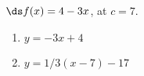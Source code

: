 {$\ds f(x) = 4-3x$, at $c=7$.
}
{\begin{enumerate}
\item		$y = -3x+4$
\item		$y = 1/3(x-7)-17$
\end{enumerate}
}
